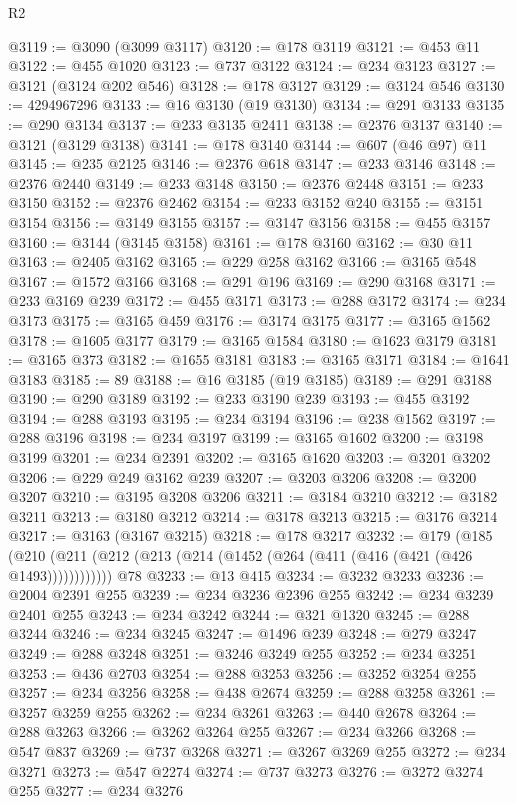 \begin{lexlean}{R2}
\begin{coremodule}
@3119 := @3090 (@3099 @3117)
@3120 := @178 @3119
@3121 := @453 @11
@3122 := @455 @1020
@3123 := @737 @3122
@3124 := @234 @3123
@3127 := @3121 (@3124 @202 @546)
@3128 := @178 @3127
@3129 := @3124 @546
@3130 := 4294967296
@3133 := @16 @3130 (@19 @3130)
@3134 := @291 @3133
@3135 := @290 @3134
@3137 := @233 @3135 @2411
@3138 := @2376 @3137
@3140 := @3121 (@3129 @3138)
@3141 := @178 @3140
@3144 := @607 (@46 @97) @11
@3145 := @235 @2125
@3146 := @2376 @618
@3147 := @233 @3146
@3148 := @2376 @2440
@3149 := @233 @3148
@3150 := @2376 @2448
@3151 := @233 @3150
@3152 := @2376 @2462
@3154 := @233 @3152 @240
@3155 := @3151 @3154
@3156 := @3149 @3155
@3157 := @3147 @3156
@3158 := @455 @3157
@3160 := @3144 (@3145 @3158)
@3161 := @178 @3160
@3162 := @30 @11
@3163 := @2405 @3162
@3165 := @229 @258 @3162
@3166 := @3165 @548
@3167 := @1572 @3166
@3168 := @291 @196
@3169 := @290 @3168
@3171 := @233 @3169 @239
@3172 := @455 @3171
@3173 := @288 @3172
@3174 := @234 @3173
@3175 := @3165 @459
@3176 := @3174 @3175
@3177 := @3165 @1562
@3178 := @1605 @3177
@3179 := @3165 @1584
@3180 := @1623 @3179
@3181 := @3165 @373
@3182 := @1655 @3181
@3183 := @3165 @3171
@3184 := @1641 @3183
@3185 := 89
@3188 := @16 @3185 (@19 @3185)
@3189 := @291 @3188
@3190 := @290 @3189
@3192 := @233 @3190 @239
@3193 := @455 @3192
@3194 := @288 @3193
@3195 := @234 @3194
@3196 := @238 @1562
@3197 := @288 @3196
@3198 := @234 @3197
@3199 := @3165 @1602
@3200 := @3198 @3199
@3201 := @234 @2391
@3202 := @3165 @1620
@3203 := @3201 @3202
@3206 := @229 @249 @3162 @239
@3207 := @3203 @3206
@3208 := @3200 @3207
@3210 := @3195 @3208 @3206
@3211 := @3184 @3210
@3212 := @3182 @3211
@3213 := @3180 @3212
@3214 := @3178 @3213
@3215 := @3176 @3214
@3217 := @3163 (@3167 @3215)
@3218 := @178 @3217
@3232 := @179
    (@185 (@210 (@211 (@212 (@213 (@214 (@1452 (@264 (@411 (@416 (@421 (@426 @1493))))))))))))
    @78
@3233 := @13 @415
@3234 := @3232 @3233
@3236 := @2004 @2391 @255
@3239 := @234 @3236 @2396 @255
@3242 := @234 @3239 @2401 @255
@3243 := @234 @3242
@3244 := @321 @1320
@3245 := @288 @3244
@3246 := @234 @3245
@3247 := @1496 @239
@3248 := @279 @3247
@3249 := @288 @3248
@3251 := @3246 @3249 @255
@3252 := @234 @3251
@3253 := @436 @2703
@3254 := @288 @3253
@3256 := @3252 @3254 @255
@3257 := @234 @3256
@3258 := @438 @2674
@3259 := @288 @3258
@3261 := @3257 @3259 @255
@3262 := @234 @3261
@3263 := @440 @2678
@3264 := @288 @3263
@3266 := @3262 @3264 @255
@3267 := @234 @3266
@3268 := @547 @837
@3269 := @737 @3268
@3271 := @3267 @3269 @255
@3272 := @234 @3271
@3273 := @547 @2274
@3274 := @737 @3273
@3276 := @3272 @3274 @255
@3277 := @234 @3276

\end{coremodule}
\end{lexlean}
